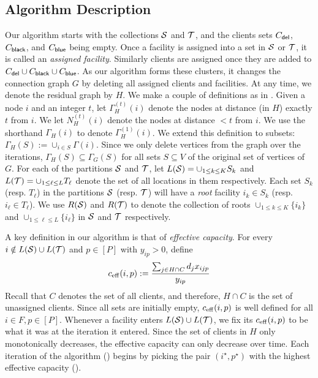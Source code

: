 \subsection{Algorithm Description}
Our algorithm starts with the collections ${\cal S}$ and ${\cal T}$, and the clients sets $C_{\mathsf{del}}$, $C_{\mathsf{black}}$, and $C_{\mathsf{blue}}$ being empty. Once a facility is assigned into a set in ${\cal S}$ or ${\cal T}$, it is called an \emph{assigned facility}. Similarly clients are assigned once they are added to $C_{\mathsf{del}} \cup C_{\mathsf{black}} \cup C_{\mathsf{blue}}$.
As our algorithm forms these clusters, it changes the connection graph $G$ by deleting all assigned clients and facilities. At any time, we denote the residual graph by $H$. 
We make a couple of definitions as in . Given a node $i$ and an integer $t$, let $\Gamma^{(t)}_H(i)$ denote the nodes at distance (in $H$) exactly $t$ from $i$. We let $N^{(t)}_H(i)$ denote the nodes at distance $< t$ from $i$.
We use the shorthand $\Gamma_H(i)$ to denote $\Gamma^{(1)}_H(i)$. We extend this definition to subsets: $\Gamma_H(S) := \cup_{i\in S}\Gamma(i)$. 
Since we only delete vertices from the graph over the iterations, $\Gamma_H(S) \subseteq \Gamma_G(S)$ for all sets $S \subseteq V$ of the original set of vertices of $G$. 
For each of the partitions ${\cal S}$ and ${\cal T}$, let $L({\cal S}) = \cup_{1\leq k \leq K} S_k$ and $L({\cal T}) = \cup_{1 \leq \ell \leq L} T_\ell$ denote the set of all locations in them respectively.
Each set $S_k$ (resp. $T_\ell$) in the partitions ${\cal S}$ (resp. ${\cal T}$) will have a {\em root} facility $i_k \in S_k$ (resp. $i_\ell \in T_\ell$). We use $R({\cal S})$ and $R({\cal T})$ to denote the collection of roots $\cup_{1 \leq k \leq K} \{i_k\}$ and $\cup_{1 \leq \ell \leq L} \{i_\ell\}$ in ${\cal S}$ and ${\cal T}$ respectively. \smallskip




A key definition in our algorithm is that of {\em effective capacity}. For every $i\notin L({\cal S})\cup L({\cal T})$ and $p\in [P]$ with $y_{ip} > 0$, define
\[
c_{\mathrm{eff}}(i,p) := \frac{\sum_{j\in H \cap C} d_j x_{ijp}}{y_{ip}}
\]
Recall that $C$ denotes the set of all clients, and therefore, $H \cap C$ is the set of unassigned clients.
Since all sets
 are initially empty, $c_{\mathrm{eff}}(i,p)$ is well defined for all $i\in F, p\in [P]$. Whenever a facility enters $L({\cal S})\cup L({\cal T})$, we fix its $c_{\mathrm{eff}}(i,p)$ to be what it was at the iteration it entered.
Since the set of clients in $H$ only monotonically decreases, the effective capacity can only decrease over time. Each iteration of the algorithm () begins by picking the pair $(i^\star, p^\star)$ with the highest
effective capacity (). %

